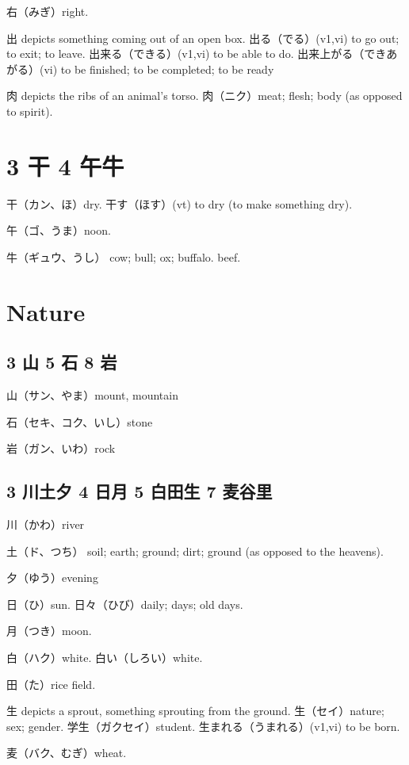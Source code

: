 右（みぎ）right.

出 depicts something coming out of an open box.
出る（でる）(v1,vi) to go out; to exit; to leave.
出来る（できる）(v1,vi) to be able to do.
出来上がる（できあがる）(vi) to be finished; to be completed; to be ready

肉 depicts the ribs of an animal's torso.
肉（ニク）meat; flesh; body (as opposed to spirit).

\section{3 干 4 午牛}

干（カン、ほ）dry.
干す（ほす）(vt) to dry (to make something dry).

午（ゴ、うま）noon.

牛（ギュウ、うし）
cow; bull; ox; buffalo.
beef.

\section{Nature}

\subsection{3 山 5 石 8 岩}

山（サン、やま）mount, mountain

石（セキ、コク、いし）stone

岩（ガン、いわ）rock

\subsection{3 川土夕 4 日月 5 白田生 7 麦谷里}

川（かわ）river

土（ド、つち）
soil; earth; ground; dirt; ground (as opposed to the heavens).

夕（ゆう）evening

日（ひ）sun.
日々（ひび）daily; days; old days.

月（つき）moon.

白（ハク）white.
白い（しろい）white.

田（た）rice field.

生 depicts a sprout, something sprouting from the ground.
生（セイ）nature; sex; gender.
学生（ガクセイ）student.
生まれる（うまれる）(v1,vi) to be born.

麦（バク、むぎ）wheat.

